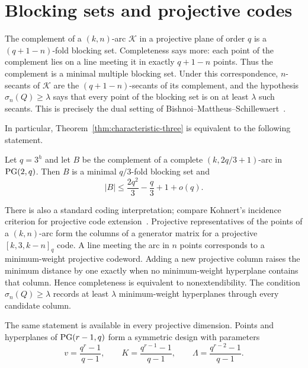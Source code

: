 \section{Blocking sets and projective codes}\label{sec:translations}

The complement of a \((k,n)\)-arc \(\mathcal K\) in a projective plane of
order \(q\) is a \((q+1-n)\)-fold blocking set.  Completeness says more: each
point of the complement lies on a line meeting it in exactly \(q+1-n\)
points.  Thus the complement is a minimal multiple blocking set.  Under this
correspondence, \(n\)-secants of \(\mathcal K\) are the
\((q+1-n)\)-secants of its complement, and the hypothesis
\(\sigma_n(Q)\ge\lambda\) says that every point of the blocking set is on at
least \(\lambda\) such secants.  This is precisely the dual setting of
Bishnoi--Mattheus--Schillewaert~\cite[Section~8]{BMS}.

In particular, Theorem~\ref{thm:characteristic-three} is equivalent to the
following statement.

\begin{corollary}\label{cor:blocking-set-form}
Let \(q=3^h\) and let \(B\) be the complement of a complete
\((k,2q/3+1)\)-arc in \(\mathrm{PG}(2,q)\).  Then \(B\) is a minimal
\(q/3\)-fold blocking set and
\[
 |B|\le \frac{2q^2}{3}-\frac q3+1+o(q).
\]
\end{corollary}

There is also a standard coding interpretation; compare Kohnert's incidence
criterion for projective code extension~\cite{Kohnert}.  Projective representatives
of the points of a \((k,n)\)-arc form the columns of a generator matrix for a
projective \([k,3,k-n]_q\) code.  A line meeting the arc in \(n\) points
corresponds to a minimum-weight projective codeword.  Adding a new projective
column raises the minimum distance by one exactly when no minimum-weight
hyperplane contains that column.  Hence completeness is equivalent to
nonextendibility.  The condition \(\sigma_n(Q)\ge\lambda\) records at least
\(\lambda\) minimum-weight hyperplanes through every candidate column.

The same statement is available in every projective dimension.  Points and
hyperplanes of \(\mathrm{PG}(r-1,q)\) form a symmetric design with parameters
\begin{equation}\label{eq:projective-design-parameters}
 v=\frac{q^r-1}{q-1},\qquad
 K=\frac{q^{r-1}-1}{q-1},\qquad
 \Lambda=\frac{q^{r-2}-1}{q-1}.
\end{equation}

